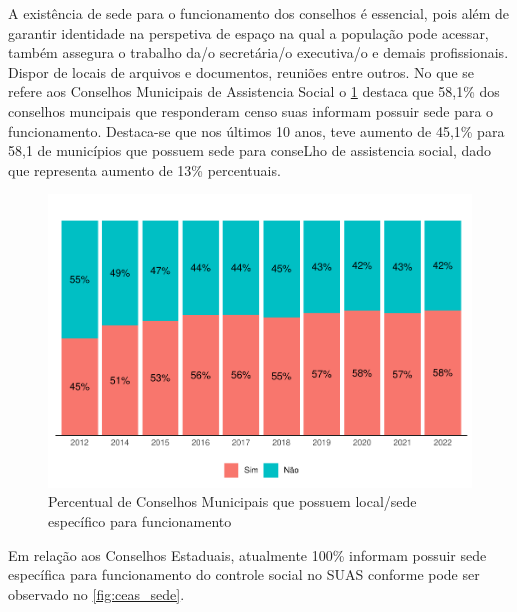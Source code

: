 \documentclass[
  brazilian]{report}
\begin{document}
A existência de sede para o funcionamento dos conselhos é essencial,
pois além de garantir identidade na perspetiva de espaço na qual a
população pode acessar, também assegura o trabalho da/o secretária/o
executiva/o e demais profissionais. Dispor de locais de arquivos e
documentos, reuniões entre outros. No que se refere aos Conselhos
Municipais de Assistencia Social o \cref{fig:cmas_sede} destaca que
58,1\% dos conselhos muncipais que responderam censo suas informam
possuir sede para o funcionamento. Destaca-se que nos últimos 10 anos,
teve aumento de 45,1\% para 58,1 de municípios que possuem sede para
conseLho de assistencia social, dado que representa aumento de 13\%
percentuais.

\begin{figure}
\includegraphics{Censo-SUAS-2022_files/figure-latex/cmas_sede-1} \caption[Percentual de Conselhos Municipais que possuem local/sede específico para funcionamento]{Percentual de Conselhos Municipais que possuem local/sede específico para funcionamento}\label{fig:cmas_sede}
\end{figure}

Em relação aos Conselhos Estaduais, atualmente 100\% informam possuir
sede específica para funcionamento do controle social no SUAS conforme
pode ser observado no \cref{fig:ceas_sede}.
\end{document}
